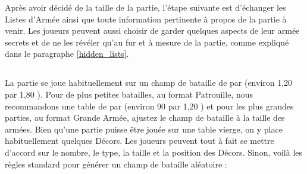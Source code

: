 Après avoir décidé de la taille de la partie, l'étape suivante est d'échanger les Listes d'Armée ainsi que toute information pertinente à propos de la partie à venir. Les joueurs peuvent aussi choisir de garder quelques aspects de leur armée secrets et de ne les révéler qu'au fur et à mesure de la partie, comme expliqué dans le paragraphe \ref{hidden_lists}.

\newpage
\hypertarget{buildbattlefield}{\subsection[Installer le champ de bataille]{}}

La partie se joue habituellement sur un champ de bataille de  par  (environ 1,20 {\meter} par 1,80 {\meter}). Pour de plus petites batailles, au format Patrouille, nous recommandons une table de  par  (environ 90 {\centi\meter} par 1,20 {\meter}) et pour les plus grandes parties, au format Grande Armée, ajustez le champ de bataille à la taille des armées. Bien qu'une partie puisse être jouée sur une table vierge, on y place habituellement quelques Décors. Les joueurs peuvent tout à fait se mettre d'accord sur le nombre, le type, la taille et la position des Décors. Sinon, voilà les règles standard pour générer un champ de bataille aléatoire :

